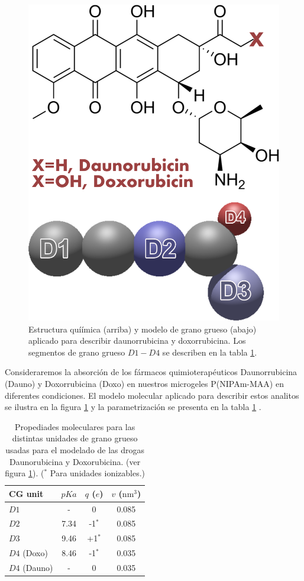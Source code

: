 \begin{figure}[!tb]
\centering
\includegraphics[width=0.35\linewidth]{Figures/graph-gel/dauno-doxo.png}
\caption{Estructura quí\'imica (arriba) y modelo de grano grueso (abajo) aplicado para describir daunorrubicina y doxorrubicina.
	Los segmentos de grano grueso $D1-D4$ se describen en la tabla \ref{table:gel:drugs}.}
\label{fig:gel:dauno-doxo}
\end{figure}


Consideraremos la absorci\'on de los f\'armacos quimioterap\'euticos Daunorrubicina (Dauno) y Doxorrubicina (Doxo) en nuestros microgeles P(NIPAm-MAA) en diferentes condiciones.
El modelo molecular aplicado para describir estos analitos se ilustra en la figura \ref{fig:gel:dauno-doxo} y la parametrizaci\'on se presenta en la tabla \ref{table:gel:drugs} \cite{PerezChavez2020}.

\begin{table}
\centering
\begin{tabular}{|lccc|}
    \hline
    {CG unit} & {$pKa$} & {$q$ ($e$)} & {$v$ ($\text{nm}^3$)} \\
      \hline
$D1$ & - & 0 & 0.085\\
$D2$ & 7.34 & -1$^\ast$ & 0.085\\
$D3$ & 9.46 & +1$^\ast$ & 0.085\\ 
$D4$ (Doxo) & 8.46 & -1$^\ast$ & 0.035\\
$D4$ (Dauno) & - & 0 & 0.035 \\
    \hline
  \end{tabular}
 \caption{Propediades moleculares para las distintas unidades de grano grueso usadas para el modelado de las drogas Daunorubicina y Doxorubicina. (ver figura \ref{fig:gel:dauno-doxo}).
\footnotesize ($^\ast$ Para unidades ionizables.)}
\label{table:gel:drugs} 
\end{table}




